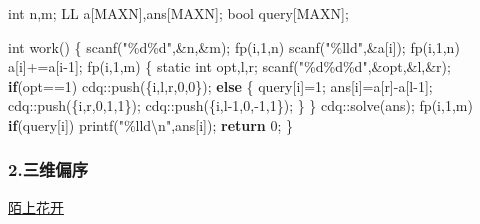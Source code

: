 \documentclass[
]{article}
\newenvironment{Shaded}{}{}
\newcommand{\AttributeTok}[1]{\textcolor[rgb]{0.49,0.56,0.16}{#1}}
\newcommand{\ControlFlowTok}[1]{\textcolor[rgb]{0.00,0.44,0.13}{\textbf{#1}}}
\newcommand{\DataTypeTok}[1]{\textcolor[rgb]{0.56,0.13,0.00}{#1}}
\newcommand{\DecValTok}[1]{\textcolor[rgb]{0.25,0.63,0.44}{#1}}
\newcommand{\NormalTok}[1]{#1}
\newcommand{\SpecialCharTok}[1]{\textcolor[rgb]{0.25,0.44,0.63}{#1}}
\newcommand{\StringTok}[1]{\textcolor[rgb]{0.25,0.44,0.63}{#1}}
\begin{document}
\begin{Shaded}
\begin{Highlighting}[]
\DataTypeTok{int}\NormalTok{ n,m;}
\NormalTok{LL a[MAXN],ans[MAXN];}
\DataTypeTok{bool}\NormalTok{ query[MAXN];}

\DataTypeTok{int}\NormalTok{ work()}
\NormalTok{\{}
\NormalTok{    scanf(}\StringTok{"}\SpecialCharTok{\%d\%d}\StringTok{"}\NormalTok{,\&n,\&m);}
\NormalTok{    fp(i,}\DecValTok{1}\NormalTok{,n) scanf(}\StringTok{"}\SpecialCharTok{\%lld}\StringTok{"}\NormalTok{,\&a[i]);}
\NormalTok{    fp(i,}\DecValTok{1}\NormalTok{,n) a[i]+=a[i{-}}\DecValTok{1}\NormalTok{];}
\NormalTok{    fp(i,}\DecValTok{1}\NormalTok{,m)}
\NormalTok{    \{}
        \AttributeTok{static} \DataTypeTok{int}\NormalTok{ opt,l,r;}
\NormalTok{        scanf(}\StringTok{"}\SpecialCharTok{\%d\%d\%d}\StringTok{"}\NormalTok{,\&opt,\&l,\&r);}
        \ControlFlowTok{if}\NormalTok{(opt==}\DecValTok{1}\NormalTok{) cdq::push(\{i,l,r,}\DecValTok{0}\NormalTok{,}\DecValTok{0}\NormalTok{\});}
        \ControlFlowTok{else}
\NormalTok{        \{}
\NormalTok{            query[i]=}\DecValTok{1}\NormalTok{;}
\NormalTok{            ans[i]=a[r]{-}a[l{-}}\DecValTok{1}\NormalTok{];}
\NormalTok{            cdq::push(\{i,r,}\DecValTok{0}\NormalTok{,}\DecValTok{1}\NormalTok{,}\DecValTok{1}\NormalTok{\});}
\NormalTok{            cdq::push(\{i,l{-}}\DecValTok{1}\NormalTok{,}\DecValTok{0}\NormalTok{,{-}}\DecValTok{1}\NormalTok{,}\DecValTok{1}\NormalTok{\});}
\NormalTok{        \}}
\NormalTok{    \}}
\NormalTok{    cdq::solve(ans);}
\NormalTok{    fp(i,}\DecValTok{1}\NormalTok{,m) }\ControlFlowTok{if}\NormalTok{(query[i]) printf(}\StringTok{"}\SpecialCharTok{\%lld\textbackslash{}n}\StringTok{"}\NormalTok{,ans[i]);}
    \ControlFlowTok{return} \DecValTok{0}\NormalTok{;}
\NormalTok{\}}
\end{Highlighting}
\end{Shaded}

\hypertarget{ux4e09ux7ef4ux504fux5e8f}{%
\subsubsection{2.三维偏序}\label{ux4e09ux7ef4ux504fux5e8f}}

\href{https://www.luogu.org/problem/P3810}{陌上花开}
\end{document}
